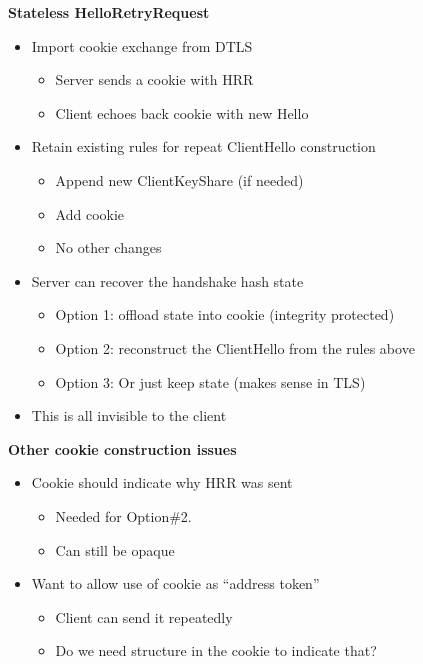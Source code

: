\documentclass[helvetica]{seminar}
\newcommand{\heading}[1]{%
  \begin{center} 
    \large\bf 
    #1 
  \end{center} 
  \vspace{.4 in}}
\begin{document}
\begin{slide}
\heading{Stateless HelloRetryRequest}

\vspace{-3ex}
\begin{itemize}
\item Import cookie exchange from DTLS
  \begin{itemize}
  \item Server sends a cookie with HRR
  \item Client echoes back cookie with new Hello
  \end{itemize}

\item Retain existing rules for repeat ClientHello construction
  \begin{itemize}
  \item Append new ClientKeyShare (if needed)
  \item Add cookie
  \item No other changes
  \end{itemize}

\item Server can recover the handshake hash state
  \begin{itemize}
  \item Option 1: offload state into cookie (integrity protected)
  \item Option 2: reconstruct the ClientHello from the rules above
  \item Option 3: Or just keep state (makes sense in TLS)
  \end{itemize}
\item This is all invisible to the client
\end{itemize}
\end{slide}

\begin{slide}
\heading{Other cookie construction issues}

\begin{itemize}
\item Cookie should indicate why HRR was sent
  \begin{itemize}
  \item Needed for Option\#2.
  \item Can still be opaque
  \end{itemize}
\item Want to allow use of cookie as ``address token''
  \begin{itemize}
  \item Client can send it repeatedly
  \item Do we need structure in the cookie to indicate that?
  \end{itemize}
\end{itemize}
\end{slide}
\end{document}
